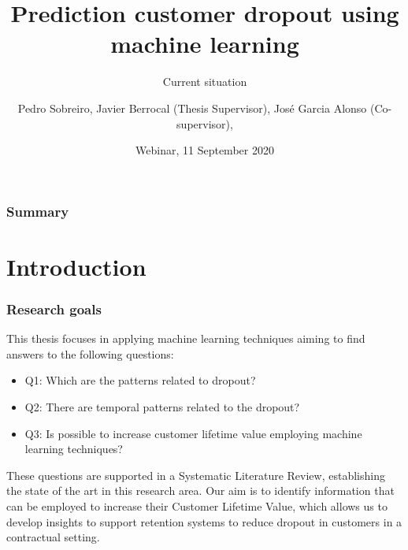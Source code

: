 \documentclass[10pt]{beamer}
\title[Dropout Prediction]{Prediction customer dropout using machine learning}
\subtitle{Current situation}
\author[Sobreiro, Berrocal, Alonso]{Pedro Sobreiro, Javier Berrocal (Thesis Supervisor), José Garcia Alonso (Co-supervisor), } %
\institute[UNEX] %
{ 
University of Extremadura ~~~~~~~~~~~~~~~%
\medskip
\textit{pdealexa@alumnos.unex.es} %
}
\date{Webinar, 11 September 2020} %
\begin{document}
\begin{frame}
	\titlepage %
\end{frame}

\begin{frame}
\frametitle{Summary} %
\tableofcontents %

\end{frame}


\section{Introduction} %

\begin{frame}
	\frametitle{Research goals}
	\Large{This thesis focuses in applying machine learning techniques aiming to find answers to the following questions:} \normalsize
	\begin{itemize}
		\item Q1: Which are the patterns related to dropout?
		\item Q2: There are temporal patterns related to the dropout?
		\item Q3: Is possible to increase customer lifetime value employing machine learning techniques? 
	\end{itemize}
	These questions are supported in a Systematic Literature Review, establishing the state of the art in this research area. Our aim is to 
	identify information that can be employed to increase their Customer Lifetime Value, which allows us to develop insights 
	to support retention systems to reduce dropout in customers in a contractual setting.
	
\end{frame}
\end{document}
